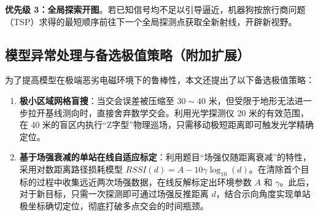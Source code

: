 \documentclass[12pt,a4paper]{article}
\begin{document}
\noindent\textbf{优先级 3：全局探索开图}。若已知信号均不足以引导逼近，机器狗按旅行商问题（TSP）求得的最短顺序前往下一个全局探测点获取全新射线，开辟新视野。

\subsection{模型异常处理与备选极值策略（附加扩展）}
为了提高模型在极端恶劣电磁环境下的鲁棒性，本文还提出了以下备选极值策略：
\begin{enumerate}
    \item \textbf{极小区域网格盲搜}：当交会误差被压缩至 $30\sim 40$ 米，但受限于地形无法进一步拉开基线测向时，直接舍弃数学交会。利用光学探测仪 20 米的有效范围，在 40 米的盲区内执行“Z字型”物理巡场，只需移动极短距离即可触发光学精确定位。
    \item \textbf{基于场强衰减的单站在线自适应标定}：利用题目“场强仅随距离衰减”的特性，采用对数距离路径损耗模型 $RSSI(d) = A - 10 \gamma \log_{10}(d)$。在清除首个目标的过程中收集远近两次场强数据，在线反解标定出环境参数 $A$ 和 $\gamma$。此后，对于新目标，只需一次探测即可通过场强反推距离 $d$，结合示向角度实现单站极坐标确切定位，彻底打破多点交会的时间瓶颈。
\end{enumerate}
\end{document}
